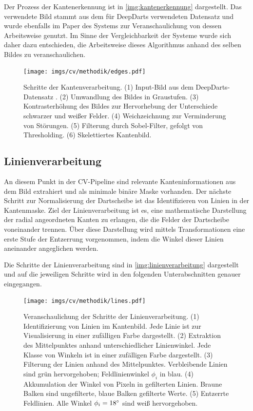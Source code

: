 Der Prozess der Kantenerkennung ist in \autoref{img:kantenerkennung} dargestellt. Das verwendete Bild stammt aus dem für DeepDarts verwendeten Datensatz und wurde ebenfalls im Paper des Systems zur Veranschaulichung von dessen Arbeitsweise genutzt. Im Sinne der Vergleichbarkeit der Systeme wurde sich daher dazu entschieden, die Arbeitsweise dieses Algorithmus anhand des selben Bildes zu veranschaulichen.

\begin{figure}
    \centering
    \texttt{[image: imgs/cv/methodik/edges.pdf]}
    \caption{Schritte der Kantenverarbeitung. (1) Input-Bild aus dem DeepDarts-Datensatz \cite{deepdarts-data}. (2) Umwandlung des Bildes in Graustufen. (3) Kontrasterhöhung des Bildes zur Hervorhebung der Unterschiede schwarzer und weißer Felder. (4) Weichzeichnung zur Verminderung von Störungen. (5) Filterung durch Sobel-Filter, gefolgt von Thresholding. (6) Skelettiertes Kantenbild.}
    \label{img:kantenerkennung}
\end{figure}

\subsection{Linienverarbeitung}
\label{sec:linien}

An diesem Punkt in der CV-Pipeline sind relevante Kanteninformationen aus dem Bild extrahiert und als minimale binäre Maske vorhanden. Der nächste Schritt zur Normalisierung der Dartscheibe ist das Identifizieren von Linien in der Kantenmaske. Ziel der Linienverarbeitung ist es, eine mathematische Darstellung der radial angeordneten Kanten zu erlangen, die die Felder der Dartscheibe voneinander trennen. Über diese Darstellung wird mittels Transformationen eine erste Stufe der Entzerrung vorgenommen, indem die Winkel dieser Linien aneinander angeglichen werden.

Die Schritte der Linienverarbeitung sind in \autoref{img:linienverarbeitung} dargestellt und auf die jeweiligen Schritte wird in den folgenden Unterabschnitten genauer eingegangen.

\begin{figure}
    \centering
    \texttt{[image: imgs/cv/methodik/lines.pdf]}
    \caption{Veranschaulichung der Schritte der Linienverarbeitung. (1) Identifizierung von Linien im Kantenbild. Jede Linie ist zur Visualisierung in einer zufälligen Farbe dargestellt. (2) Extraktion des Mittelpunktes anhand unterschiedlicher Linienwinkel. Jede Klasse von Winkeln ist in einer zufälligen Farbe dargestellt. (3) Filterung der Linien anhand des Mittelpunktes. Verbleibende Linien sind grün hervorgehoben; Feldlinienwinkel $\phi_i$ in blau. (4) Akkumulation der Winkel von Pixeln in gefilterten Linien. Braune Balken sind ungefilterte, blaue Balken gefilterte Werte. (5) Entzerrte Feldlinien. Alle Winkel $\phi_i=18^{\circ}$ sind weiß hervorgehoben.}
    \label{img:linienverarbeitung}
\end{figure}

